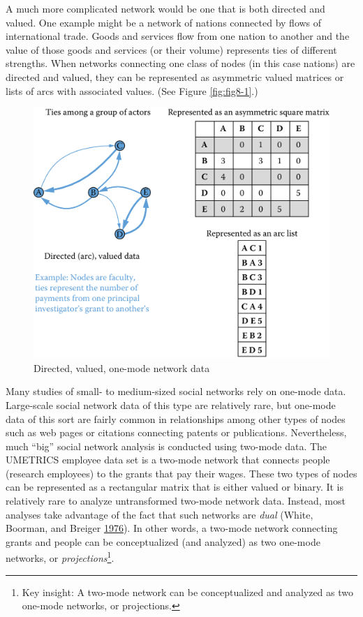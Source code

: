 \documentclass[]{krantz}
\begin{document}
A much more complicated network would be one that is both directed and
valued. One example might be a network of nations connected by flows of
international trade. Goods and services flow from one nation to another
and the value of those goods and services (or their volume) represents
ties of different strengths. When networks connecting one class of nodes
(in this case nations) are directed and valued, they can be represented
as asymmetric valued matrices or lists of arcs with associated values.
(See Figure \ref{fig:fig8-1}.)

\begin{figure}

{\centering \includegraphics[width=0.7\linewidth]{ChapterNetworks/figures/fig8-2} 

}

\caption{Directed, valued, one-mode network data}\label{fig:fig8-2}
\end{figure}

Many studies of small- to medium-sized social networks rely on one-mode
data. Large-scale social network data of this type are relatively rare,
but one-mode data of this sort are fairly common in relationships among
other types of nodes such as web pages or citations connecting patents
or publications. Nevertheless, much ``big'' social network analysis is
conducted using two-mode data. The UMETRICS employee data set is a
two-mode network that connects people (research employees) to the grants
that pay their wages. These two types of nodes can be represented as a
rectangular matrix that is either valued or binary. It is relatively
rare to analyze untransformed two-mode network data. Instead, most
analyses take advantage of the fact that such networks are \emph{dual}
(White, Boorman, and Breiger
\protect\hyperlink{ref-white1976social}{1976}). In other words, a
two-mode network connecting grants and people can be conceptualized (and
analyzed) as two one-mode networks, or \emph{projections}\footnote{Key
  insight: A two-mode network can be conceptualized and analyzed as two
  one-mode networks, or projections.}.
\end{document}
